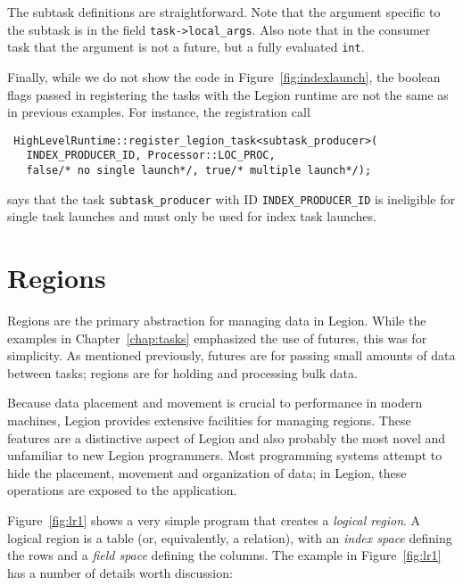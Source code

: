 \documentclass[11pt]{book}
\begin{document}
The subtask definitions are straightforward.  Note that the argument specific to the subtask is
in the field {\tt task->local\_args}.  Also note that in the consumer task that 
the argument is not a future, but a fully evaluated {\tt int}.

Finally, while we do not show the code in Figure~\ref{fig:indexlaunch}, the boolean
flags passed in registering the tasks with the Legion runtime are not the same as in
previous examples.  For instance, the registration call
\begin{verbatim}
 HighLevelRuntime::register_legion_task<subtask_producer>(
   INDEX_PRODUCER_ID, Processor::LOC_PROC, 
   false/* no single launch*/, true/* multiple launch*/);
\end{verbatim}
says that the task {\tt subtask\_producer} with ID {\tt INDEX\_PRODUCER\_ID} is ineligible for
single task launches and must only be used for index task launches.


\chapter{Regions}
\label{chap:regions}

Regions are the primary abstraction for managing data in Legion.  While the
examples in Chapter~\ref{chap:tasks} emphasized the use of futures, this was for
simplicity.  As mentioned previously, futures are for passing small amounts of data
between tasks; regions are for holding and processing bulk data.

Because data placement and movement is crucial to performance in modern machines,
Legion provides extensive facilities for managing regions.  These features are a
distinctive aspect of Legion and also probably the most novel and unfamiliar 
to new Legion programmers.  Most programming systems attempt to hide the placement,
movement and organization of data; in Legion, these operations are exposed to
the application.

Figure~\ref{fig:lr1} shows a very simple program that
creates a {\em logical region}.  A logical region is a table (or,
equivalently, a relation), with an {\em index space} defining the rows
and a {\em field space} defining the columns. The example
in Figure~\ref{fig:lr1} has a number of details worth discussion:
\end{document}
